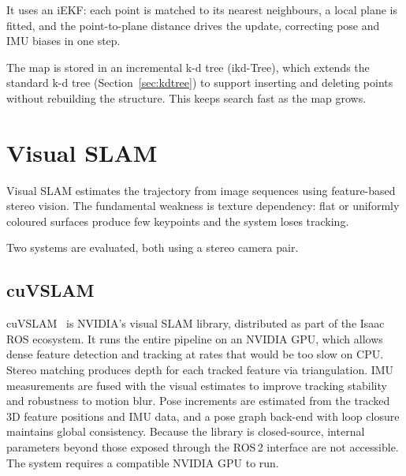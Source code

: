 It uses an iEKF: each point is matched to its nearest neighbours, a local plane is
fitted, and the point-to-plane distance drives the update, correcting pose and IMU
biases in one step.

The map is stored in an incremental k-d tree (ikd-Tree), which extends the
standard k-d tree (Section~\ref{sec:kdtree}) to support inserting and deleting
points without rebuilding the structure. This keeps search fast as the map
grows.

%
%

\section{Visual SLAM}

Visual SLAM estimates the trajectory from image sequences using feature-based stereo vision.
The fundamental weakness is texture dependency: flat or uniformly coloured surfaces
produce few keypoints and the system loses tracking.

Two systems are evaluated, both using a stereo camera pair.

\subsection{cuVSLAM}

cuVSLAM~\cite{cuvslam_docs} is NVIDIA's visual SLAM library, distributed as part of the Isaac
ROS ecosystem. It runs the entire pipeline on an NVIDIA GPU, which allows dense feature
detection and tracking at rates that would be too slow on CPU. Stereo
matching produces depth for each tracked feature via triangulation. IMU measurements are
fused with the visual estimates to improve tracking stability and robustness to motion blur.
Pose increments are estimated from the tracked 3D feature positions and IMU data, and a
pose graph back-end with loop closure maintains global consistency. Because the library
is closed-source, internal parameters beyond those exposed through the ROS\,2 interface
are not accessible. The system requires a compatible NVIDIA GPU to run.


